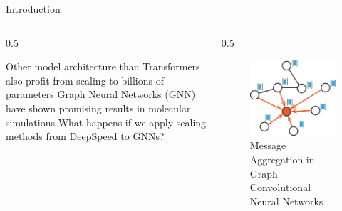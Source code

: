 \begin{frame}{Introduction}
    \begin{columns}
        \begin{column}{{0.5\textwidth}}
            \begin{itemize}
                \bitem Other model architecture than Transformers also profit 
                from scaling to billions of parameters
                \bitem Graph Neural Networks (GNN) have shown promising results 
                in molecular simulations
                \bitem What happens if we apply scaling methods from DeepSpeed 
                to GNNs? 
            \end{itemize}
        \end{column}

        \begin{column}{{0.5\textwidth}}
            \begin{center}
                \begin{figure}[H]
                    \centering
                    \captionsetup{justification=centering}
                    \includegraphics[scale=.20]{figures/introduction/deepspeed-gnns.png}
                    \caption*{\scriptsize Message Aggregation in Graph Convolutional Neural Networks}
                \end{figure}
                \vspace*{-1cm}
                \begin{figure}[H]

\end{figure}
\end{center}
\end{column}
\end{columns}
\end{frame}
